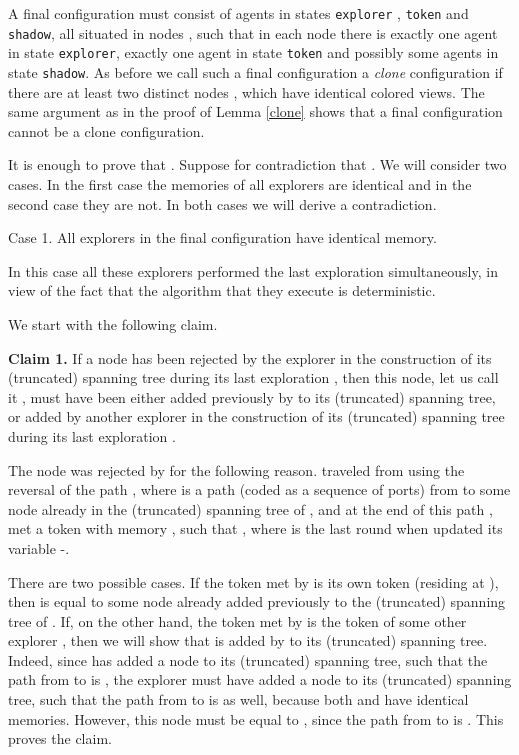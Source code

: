 \documentclass[11pt]{article}
\newcommand{\finclaim}{\hfill }
\newcommand{\qed}{\hfill  \bigbreak}
\newenvironment{proof}{\noindent {\bf Proof.}}{\qed}
\begin{document}
    \begin{proof}
    A final configuration must consist of agents in states  {\tt explorer} , 
{\tt token} and {\tt shadow}, all situated in nodes , such that in each node  there is exactly one agent  in state {\tt explorer}, exactly one
agent  in state {\tt token}  and possibly some agents in state  {\tt shadow}. As before we call such a final configuration a {\em clone} 
configuration if there are at least two
distinct nodes ,  which have identical colored views. The same argument as in the proof of Lemma \ref{clone} shows that
a final configuration cannot be a clone configuration. 

It is enough to prove that . Suppose for contradiction that . We will consider two cases. In the first case the memories of all explorers  are
identical and in the second case they are not. In both cases we will derive a contradiction.

 \vspace*{0.2cm}
        \noindent
Case 1. All explorers  in the final configuration have identical memory.

In this case all these explorers performed the last exploration  simultaneously, {in view of the fact that the algorithm that they execute is deterministic}.

We start with the following claim.

 \vspace*{0.2cm}
        \noindent
{\bf Claim 1.} {If a node has been rejected by the explorer  in the construction of its {(truncated) spanning} tree during its last exploration , then
this node, let us call it , must have been either added previously by  to its {(truncated) spanning} tree, or added  by another explorer 
in the construction of its {(truncated) spanning} tree during its last exploration .} 

The node  was rejected by  for the following reason.   
traveled from  using the reversal  of the path , where  is a path (coded as a sequence of ports) from  to some node
 already in the {(truncated) spanning} tree of , and at the end of this path ,  met a token with memory , such that ,
where  is the last round when  updated its variable -.

There are two possible cases. If the token met by  is its own token (residing at ), then  is equal to some node  already added previously
to the {(truncated) spanning} tree of .  If, on the other hand, the token
met by  is the token of some other explorer , then we will show that  is added by  to its {(truncated) spanning tree}. 
Indeed, since  has added a node 
to its {(truncated) spanning} tree, such that the path from  to  is , the explorer  must have added a node  to its {(truncated) spanning} tree, such that the path from  to  is 
as well, because both  and  have identical memories. However, this node  must be equal to , since the path from  to  is .
This proves the claim.\finclaim


\end{proof}
\end{document}
